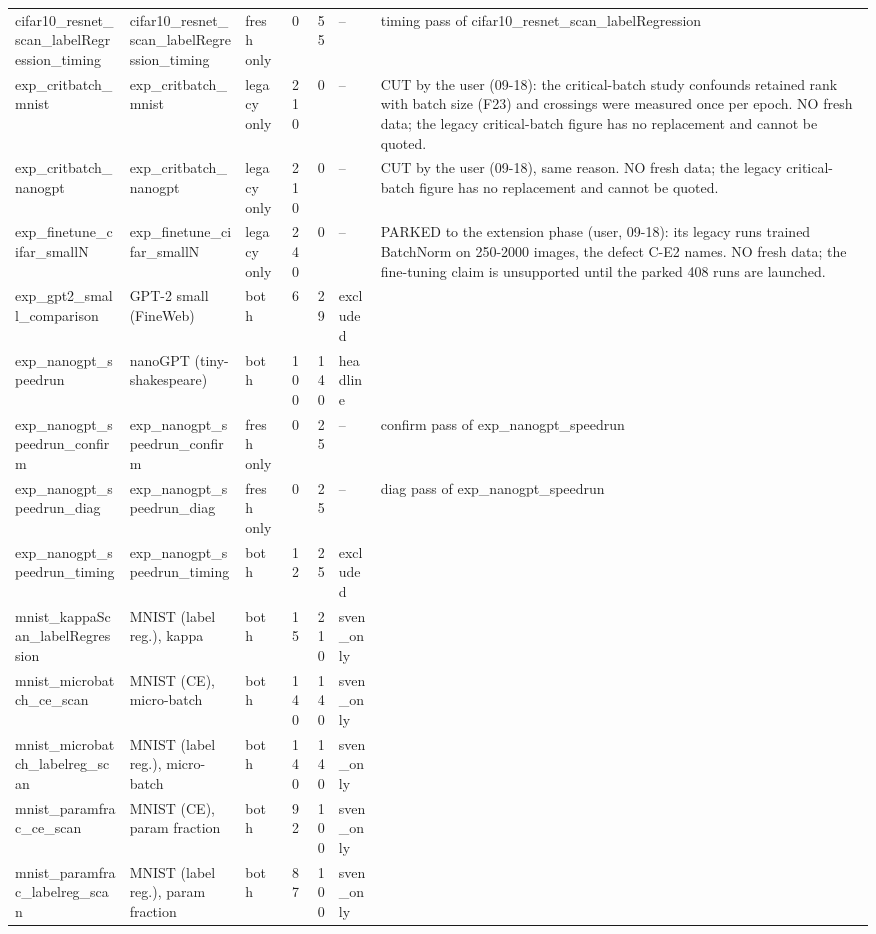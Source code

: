 \begin{tabular}{lllrrll}
cifar10\_resnet\_scan\_labelRegression\_timing & cifar10\_resnet\_scan\_labelRegression\_timing & fresh only & 0 & 55 & -- & timing pass of cifar10\_resnet\_scan\_labelRegression \\
exp\_critbatch\_mnist & exp\_critbatch\_mnist & legacy only & 210 & 0 & -- & CUT by the user (09-18): the critical-batch study confounds retained rank with batch size (F23) and crossings were measured once per epoch. NO fresh data; the legacy critical-batch figure has no replacement and cannot be quoted. \\
exp\_critbatch\_nanogpt & exp\_critbatch\_nanogpt & legacy only & 210 & 0 & -- & CUT by the user (09-18), same reason. NO fresh data; the legacy critical-batch figure has no replacement and cannot be quoted. \\
exp\_finetune\_cifar\_smallN & exp\_finetune\_cifar\_smallN & legacy only & 240 & 0 & -- & PARKED to the extension phase (user, 09-18): its legacy runs trained BatchNorm on 250-2000 images, the defect C-E2 names. NO fresh data; the fine-tuning claim is unsupported until the parked 408 runs are launched. \\
exp\_gpt2\_small\_comparison & GPT-2 small (FineWeb) & both & 6 & 29 & excluded &  \\
exp\_nanogpt\_speedrun & nanoGPT (tiny-shakespeare) & both & 100 & 140 & headline &  \\
exp\_nanogpt\_speedrun\_confirm & exp\_nanogpt\_speedrun\_confirm & fresh only & 0 & 25 & -- & confirm pass of exp\_nanogpt\_speedrun \\
exp\_nanogpt\_speedrun\_diag & exp\_nanogpt\_speedrun\_diag & fresh only & 0 & 25 & -- & diag pass of exp\_nanogpt\_speedrun \\
exp\_nanogpt\_speedrun\_timing & exp\_nanogpt\_speedrun\_timing & both & 12 & 25 & excluded &  \\
mnist\_kappaScan\_labelRegression & MNIST (label reg.), kappa & both & 15 & 210 & sven\_only &  \\
mnist\_microbatch\_ce\_scan & MNIST (CE), micro-batch & both & 140 & 140 & sven\_only &  \\
mnist\_microbatch\_labelreg\_scan & MNIST (label reg.), micro-batch & both & 140 & 140 & sven\_only &  \\
mnist\_paramfrac\_ce\_scan & MNIST (CE), param fraction & both & 92 & 100 & sven\_only &  \\
mnist\_paramfrac\_labelreg\_scan & MNIST (label reg.), param fraction & both & 87 & 100 & sven\_only &  \\

\end{tabular}
